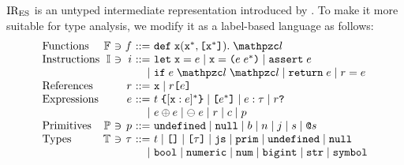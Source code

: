 ${\text{IR}_\text{ES}}$ is an untyped intermediate representation introduced by \citet{jiset}.
To make it more suitable for type analysis, we modify it as a label-based
language as follows:
\small
\[
  \begin{array}{l@{~}r@{~}c@{~}r@{~}r@{~}l}
    \text{Functions}
    &\funcset&\ni&\func&::=&\kwdef \; \x (\x^*, \kwsl \x^* \kwsr). \; \lab\\

    \text{Instructions}
    &\instset&\ni&\inst&::=&
    \kwlet \; \x = \expr \mid
    \x = \kwrl \expr \; \expr^* \kwrr \mid
    \kwassert \; \expr \\

    &&&&\mid&
    \kwif \; \expr \; \lab \; \lab \mid
    \kwreturn \; \expr \mid
    \refer = \expr \\

    \text{References}
    &&&\refer&::=&
    \x \mid
    \refer \kwsl \expr \kwsr \\

    \text{Expressions}
    &&&\expr&::=&
    \tname \; \kwcl [\x: \expr]^* \kwcr \mid
    \clist{\expr^*} \mid
    \expr: \ty \mid
    \refer \kwexists \\

    &&&&\mid&
    \expr \bop \expr \mid
    \uop \; \expr \mid
    \refer \mid
    \const \mid
    \prim \\

    \text{Primitives}
    &\primset&\ni&\prim&::=&
    \undefval \mid \nullval \mid \bool \mid
    \num \mid \bigint \mid \str \mid \symb \\

    \text{Types}
    &\tyset&\ni&\ty&::=&\tname \mid \clist{} \mid \clist{\ty} \mid \tjs \mid
    \tprim \mid \undefval \mid \nullval\\

    &&&&\mid&
    \tbool \mid \tnumeric \mid \tnum \mid \tbigint \mid \tstr \mid \tsymb \\
  \end{array}
\]

